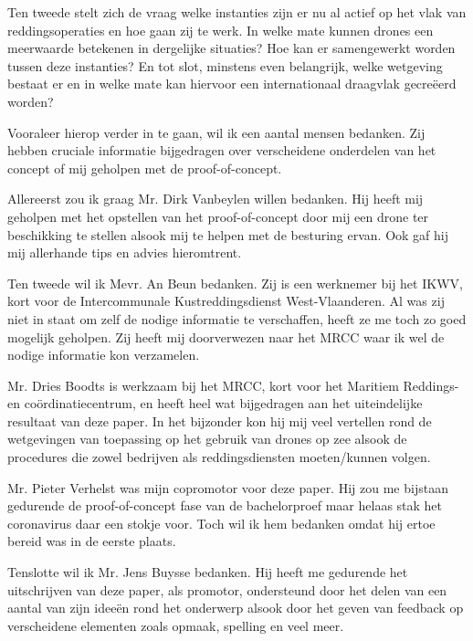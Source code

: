 Ten tweede stelt zich de vraag welke instanties zijn er nu al actief op het vlak van reddingsoperaties en hoe gaan zij te werk. In welke mate kunnen drones een meerwaarde betekenen in dergelijke situaties? Hoe kan er samengewerkt worden tussen deze instanties? En tot slot, minstens even belangrijk, welke wetgeving bestaat er en in welke mate kan hiervoor een internationaal draagvlak gecreëerd worden?

Vooraleer hierop verder in te gaan, wil ik een aantal mensen bedanken. Zij hebben cruciale informatie bijgedragen over verscheidene onderdelen van het concept of mij geholpen met de proof-of-concept.

Allereerst zou ik graag Mr. Dirk Vanbeylen willen bedanken. Hij heeft mij geholpen met het opstellen van het proof-of-concept door mij een drone ter beschikking te stellen alsook mij te helpen met de besturing ervan. Ook gaf hij mij allerhande tips en advies hieromtrent.

Ten tweede wil ik Mevr. An Beun bedanken. Zij is een werknemer bij het IKWV, kort voor de Intercommunale Kustreddingsdienst West-Vlaanderen. Al was zij niet in staat om zelf de nodige informatie te verschaffen, heeft ze me toch zo goed mogelijk geholpen. Zij heeft mij doorverwezen naar het MRCC waar ik wel de nodige informatie kon verzamelen.

Mr. Dries Boodts is werkzaam bij het MRCC, kort voor het Maritiem Reddings- en coördinatiecentrum, en heeft heel wat bijgedragen aan het uiteindelijke resultaat van deze paper. In het bijzonder kon hij mij veel vertellen rond de wetgevingen van toepassing op het gebruik van drones op zee alsook de procedures die zowel bedrijven als reddingsdiensten moeten/kunnen volgen. 

Mr. Pieter Verhelst was mijn copromotor voor deze paper. Hij zou me bijstaan gedurende de proof-of-concept fase van de bachelorproef maar helaas stak het coronavirus daar een stokje voor. Toch wil ik hem bedanken omdat hij ertoe bereid was in de eerste plaats.

Tenslotte wil ik Mr. Jens Buysse bedanken. Hij heeft me gedurende het uitschrijven van deze paper, als promotor, ondersteund door het delen van een aantal van zijn ideeën rond het onderwerp alsook door het geven van feedback op verscheidene elementen zoals opmaak, spelling en veel meer.


